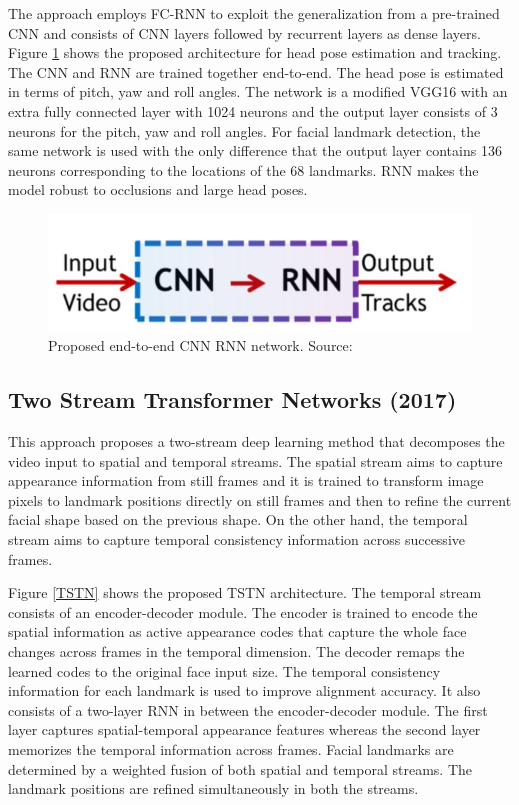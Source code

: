 \documentclass{llncs}
\begin{document}
The approach employs FC-RNN to exploit the generalization from a pre-trained CNN and consists of CNN layers followed by recurrent layers as dense layers. Figure \ref{cnn_rnn} shows the proposed architecture for head pose estimation and tracking. The CNN and RNN are trained together end-to-end. The head pose is estimated in terms of pitch, yaw and roll angles. The network is a modified VGG16 with an extra fully connected layer with 1024 neurons and the output layer consists of 3 neurons for the pitch, yaw and roll angles. For facial landmark detection, the same network is used with the only difference that the output layer contains 136 neurons corresponding to the locations of the 68 landmarks. RNN makes the model robust to occlusions and large head poses.\\

\begin{figure}
	\centering
	\includegraphics[scale=0.3]{Media/cnn_rnn}
	\vspace{-3mm}
	\caption{Proposed end-to-end CNN RNN network. Source:\cite{dynamic_facial_analysis}}
	\label{cnn_rnn}
	\vspace{-3mm}
\end{figure}

	\subsection{Two Stream Transformer Networks (2017) \cite{tstn}}
This approach proposes a two-stream deep learning method that decomposes the video input to spatial and temporal streams. The spatial stream aims to capture appearance information from still frames and it is trained to transform image pixels to landmark positions directly on still frames and then to refine the current facial shape based on the previous shape. On the other hand, the temporal stream aims to capture temporal consistency information across successive frames.

Figure \ref{TSTN} shows the proposed TSTN architecture. The temporal stream consists of an encoder-decoder module. The encoder is trained to encode the spatial information as active appearance codes that capture the whole face changes across frames in the temporal dimension. The decoder remaps the learned codes to the original face input size. The temporal consistency information for each landmark is used to improve alignment accuracy. It also consists of a two-layer RNN in between the encoder-decoder module. The first layer captures spatial-temporal appearance features whereas the second layer memorizes the temporal information across frames. Facial landmarks are determined by a weighted fusion of both spatial and temporal streams. The landmark positions are refined simultaneously in both the streams.
\end{document}
